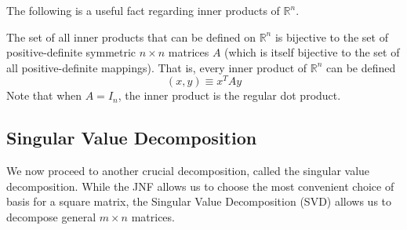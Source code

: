   The following is a useful fact regarding inner products of $\mathbb{R}^n$. 

  \begin{theorem}
    The set of all inner products that can be defined on $\mathbb{R}^n$ is bijective to the set of positive-definite symmetric $n \times n$ matrices $A$ (which is itself bijective to the set of all positive-definite mappings). That is, every inner product of $\mathbb{R}^n$ can be defined 
    \begin{equation}
      (x, y) \equiv x^T A y
    \end{equation}
    Note that when $A = I_n$, the inner product is the regular dot product.
  \end{theorem}

\subsection{Singular Value Decomposition} 

  We now proceed to another crucial decomposition, called the singular value decomposition. While the JNF allows us to choose the most convenient choice of basis for a square matrix, the Singular Value Decomposition (SVD) allows us to decompose general $m \times n$ matrices. 

